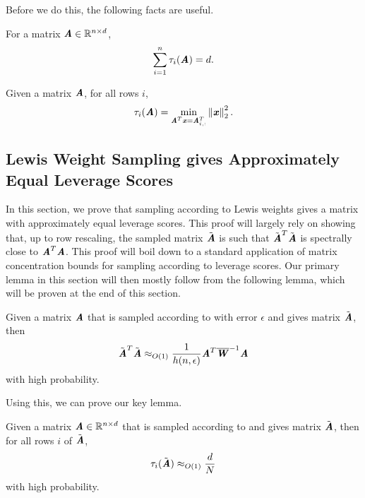 Before we do this, the following facts are useful. 

\begin{fact}
	\label{fact:fosters}
	For a matrix $\AA \in \R^{n \times d}$,
	\[\sum_{i=1}^n \tau_i(\AA) = d.\]
\end{fact}

\begin{fact}
	\label{fact:boundLev}
	Given a matrix $\AA$, for all rows $i$,
	\[\tau_i(\AA) = \min_{\AA^T\xx = \AA_{i,:}^T} \norme{\xx}^2.\]
\end{fact}


\subsection{Lewis Weight Sampling gives Approximately Equal Leverage Scores}\label{subsec:lewis}



In this section, we prove that sampling according to Lewis weights gives a matrix with approximately equal leverage scores. 
This proof will largely rely on showing that, up to row rescaling, the sampled matrix $\tilde{\AA}$ is such that $\tilde{\AA}^T\tilde{\AA}$ is spectrally close to $\AA^T\AA$.
This proof will boil down to a standard application of matrix concentration bounds for sampling according to leverage scores.
Our primary lemma in this section will then mostly follow from the following lemma, which will be proven at the end of this section.

\begin{lemma}
	\label{lem:l2Sampling}
	Given a matrix $\AA$ that is sampled according to  with error $\epsilon$ and gives matrix $\tilde{\AA}$, then
	\[ \tilde{\AA}^T\tilde{\AA} \approx_{O(1)} \frac{1}{h(n,\epsilon)}\AA^T\LW^{-1}\AA \]
	with high probability.
	
\end{lemma}

Using this, we can prove our key lemma.

\begin{lemma}
	\label{lem:lewisGivesEqualLevScores}
	Given a matrix $\AA \in \R^{n \times d}$ that is sampled according to  and gives matrix $\tilde{\AA}$, then for all rows $i$ of $\tilde{\AA}$,
	\[ \tau_i(\tilde{\AA}) \approx_{O(1)} \frac{d}{N}\]
	with high probability.
\end{lemma}

